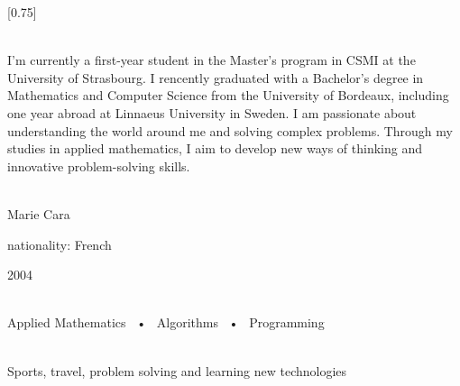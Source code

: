 \documentclass[lighthipster]{simplehipstercv}
\begin{document}
\setlength{\columnsep}{1.5cm}
[0.75]
\begin{paracol}{2}

\paracolbackgroundoptions



\footnotesize
{\setasidefontcolour
\flushright
\begin{center}
\end{center}

\\[0.5em]

{\footnotesize
    I'm currently a first-year student in the Master's program in CSMI at the University of Strasbourg.
    I rencently graduated with a Bachelor's degree in Mathematics and Computer Science from the University of Bordeaux, including one year abroad at Linnaeus University in Sweden.
    I am passionate about understanding the world around me and solving complex problems. Through my studies in applied mathematics, I aim to develop new ways of thinking and innovative problem-solving skills.
 }
\bigskip

 \\[0.5em]
Marie Cara

nationality: French 

2004

\bigskip

 \\[0.5em]

Applied Mathematics ~•~ Algorithms ~•~ Programming

\bigskip



\bigskip

\\[0.5em]
Sports, travel, problem solving and learning new technologies


\bigskip

\vspace{4em}


\phantom{turn the page}

}
\end{paracol}
\end{document}
